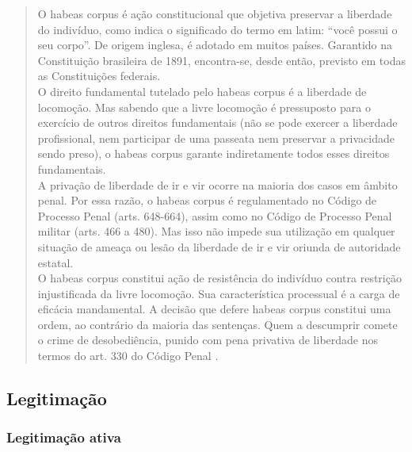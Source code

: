 \documentclass{article}
\begin{document}
\begin{quote}
    O habeas corpus é ação constitucional que objetiva preservar a liberdade do indivíduo, como indica o significado do termo em latim: “você possui o seu corpo”. De origem inglesa, é adotado em muitos países. Garantido na Constituição brasileira de 1891, encontra-se, desde então, previsto em todas as Constituições federais.\\
    O direito fundamental tutelado pelo habeas corpus é a liberdade de locomoção. Mas sabendo que a livre locomoção é pressuposto para o exercício de outros direitos fundamentais (não se pode exercer a liberdade profissional, nem participar de uma passeata nem preservar a privacidade sendo preso), o habeas corpus garante indiretamente todos esses direitos fundamentais.\\
    A privação de liberdade de ir e vir ocorre na maioria dos casos em âmbito penal. Por essa razão, o habeas corpus é regulamentado no Código de Processo Penal (arts. 648-664), assim como no Código de Processo Penal militar (arts. 466 a 480). Mas isso não impede sua utilização em qualquer situação de ameaça ou lesão da liberdade de ir e vir oriunda de autoridade estatal.\\
    O habeas corpus constitui ação de resistência do indivíduo contra restrição injustificada da livre locomoção. Sua característica processual é a carga de eficácia mandamental. A decisão que defere habeas corpus constitui uma ordem, ao contrário da maioria das sentenças. Quem a descumprir comete o crime de desobediência, punido com pena privativa de liberdade nos termos do art. 330 do Código Penal \cite[p. 401]{dimoulis_curso_2016}.
\end{quote}

\subsection{Legitimação}

\subsubsection{Legitimação ativa}
\end{document}
